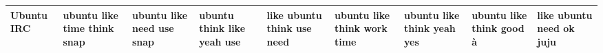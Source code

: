 \documentclass[11pt,a4paper]{article}
\begin{document}
\begin{appendices}
\begin{table*}[htb]
\begin{tiny}
\begin{tabular}{|p{}|p{}|p{}|p{}|p{}|p{}|p{}|p{}|p{}|}
    Ubuntu IRC & ubuntu \newline like \newline time \newline think \newline snap & ubuntu \newline like \newline need \newline use \newline snap & ubuntu \newline think \newline like \newline yeah \newline use & like \newline ubuntu \newline think \newline use \newline need & ubuntu \newline like \newline think \newline work \newline time & ubuntu \newline like \newline think \newline yeah \newline yes & ubuntu \newline like \newline think \newline good \newline à & like \newline ubuntu \newline need \newline ok \newline juju\\\hline

\end{tabular}
\end{tiny}
\end{table*}
\end{appendices}
\end{document}
